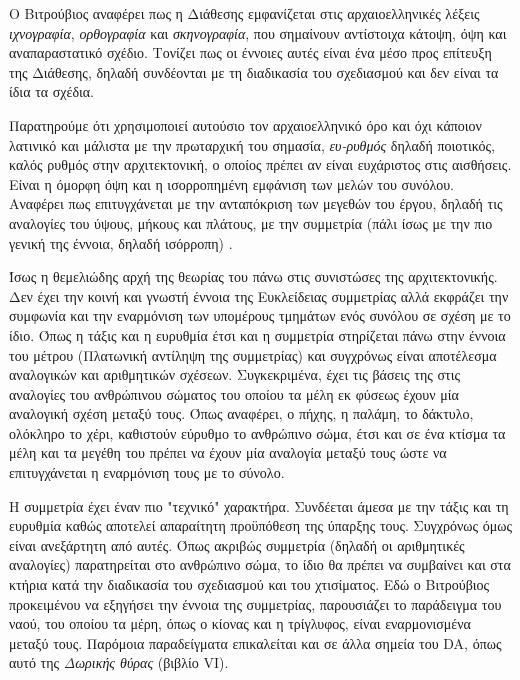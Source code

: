 \begin{description}[style=nextline]
Ο Βιτρούβιος αναφέρει πως η Διάθεσης εμφανίζεται στις αρχαιοελληνικές λέξεις \emph{ιχνογραφία}, \emph{ορθογραφία} και \emph{σκηνογραφία}, που σημαίνουν αντίστοιχα κάτοψη, όψη και αναπαραστατικό σχέδιο. Τονίζει πως οι έννοιες αυτές είναι ένα μέσο προς επίτευξη της Διάθεσης, δηλαδή συνδέονται με τη διαδικασία του σχεδιασμού και δεν είναι τα ίδια τα σχέδια. 
  
\item[Eurytmia]
  
Παρατηρούμε ότι χρησιμοποιεί αυτούσιο τον αρχαιοελληνικό όρο και όχι κάποιον 
λατινικό και μάλιστα με την πρωταρχική του σημασία, \emph{ευ-ρυθμός} δηλαδή 
ποιοτικός, καλός ρυθμός στην αρχιτεκτονική, ο οποίος πρέπει αν είναι ευχάριστος 
στις αισθήσεις. Είναι η όμορφη όψη και η ισορροπημένη εμφάνιση των μελών του 
συνόλου. Αναφέρει πως επιτυγχάνεται με την ανταπόκριση των μεγεθών του έργου, 
δηλαδή τις αναλογίες του ύψους, μήκους και πλάτους, με την συμμετρία (πάλι ίσως 
με την πιο γενική της έννοια, δηλαδή ισόρροπη) 
\cite[σ.~498]{scranton_vitruvius_1974}. 

\item[Symetria]

Ίσως η θεμελιώδης αρχή της θεωρίας του πάνω στις συνιστώσες της αρχιτεκτονικής. 
Δεν έχει την κοινή και γνωστή έννοια της Ευκλείδειας συμμετρίας αλλά εκφράζει 
την συμφωνία και την εναρμόνιση των υπομέρους τμημάτων ενός συνόλου σε σχέση με 
το ίδιο. Όπως η τάξις και η ευρυθμία έτσι και η συμμετρία στηρίζεται πάνω στην 
έννοια του μέτρου (Πλατωνική αντίληψη της συμμετρίας) και συγχρόνως είναι 
αποτέλεσμα αναλογικών και αριθμητικών σχέσεων. Συγκεκριμένα, έχει τις βάσεις 
της στις αναλογίες του ανθρώπινου σώματος του οποίου τα μέλη εκ φύσεως έχουν 
μία αναλογική σχέση μεταξύ τους. Όπως αναφέρει, ο πήχης, η παλάμη, το δάκτυλο, 
ολόκληρο το χέρι, καθιστούν εύρυθμο το ανθρώπινο σώμα, έτσι και σε ένα κτίσμα 
τα μέλη και τα μεγέθη του πρέπει να έχουν μία αναλογία μεταξύ τους ώστε να 
επιτυγχάνεται η εναρμόνιση τους με το σύνολο.

Η συμμετρία έχει έναν πιο "τεχνικό" χαρακτήρα. Συνδέεται άμεσα με την τάξις και 
τη ευρυθμία καθώς αποτελεί απαραίτητη προϋπόθεση της ύπαρξης τους. Συγχρόνως 
όμως είναι ανεξάρτητη από αυτές. Όπως ακριβώς συμμετρία (δηλαδή οι αριθμητικές 
αναλογίες) παρατηρείται στο ανθρώπινο σώμα, το ίδιο θα πρέπει να συμβαίνει και 
στα κτήρια κατά την διαδικασία του σχεδιασμού και του χτισίματος. Εδώ ο 
Βιτρούβιος προκειμένου να εξηγήσει την έννοια της συμμετρίας, παρουσιάζει το 
παράδειγμα του ναού, του οποίου τα μέρη, όπως ο κίονας και η τρίγλυφος, είναι 
εναρμονισμένα μεταξύ τους. Παρόμοια παραδείγματα επικαλείται και σε άλλα σημεία 
του DA, όπως αυτό της \emph{Δωρικής θύρας} (βιβλίο VI).


\end{description}
